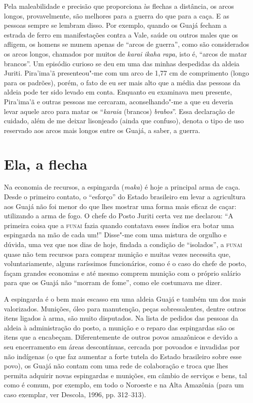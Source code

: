 Pela maleabilidade e precisão que proporciona às flechas a distância, os
arcos longos, provavelmente, são melhores para a guerra do que para a
caça. E as pessoas sempre se lembram disso. Por exemplo, quando os Guajá
fecham a estrada de ferro em manifestações contra a Vale, saúde ou
outros males que os afligem, os homens se munem apenas de ``arcos de
guerra'', como são considerados os arcos longos, chamados por muitos de
\emph{karai ikaha rapa}, isto é, ``arcos de matar brancos''. Um episódio
curioso se deu em uma das minhas despedidas da aldeia Juriti. Pira'ima'ã
presenteou"-me com um arco de 1,77 cm de comprimento (longo para os
padrões), porém, o fato de eu ser mais alto que a média das pessoas da
aldeia pode ter sido levado em conta. Enquanto eu examinava meu
presente, Pira'ima'ã e outras pessoas me cercaram, aconselhando"-me a que
eu deveria levar aquele arco para matar os ``\emph{karaia} (brancos)
\emph{brabos}''. Essa declaração de cuidado, além de me deixar lisonjeado
(ainda que confuso), denota o tipo de uso reservado aos arcos mais
longos entre os Guajá, a saber, a guerra.

\section{Ela, a flecha}

Na economia de recursos, a espingarda (\emph{maka}) é hoje a principal
arma de caça. Desde o primeiro contato, o ``esforço'' do Estado brasileiro
em levar a agricultura aos Guajá não foi menor do que lhes mostrar uma
forma mais eficaz de caçar: utilizando a arma de fogo. O chefe do Posto
Juriti certa vez me declarou: ``A primeira coisa que a \textsc{funai} fazia quando
contatava esses índios era botar uma espingarda na mão de cada um!''
Disse"-me com uma mistura de orgulho e dúvida, uma vez que nos dias de
hoje, findada a condição de ``isolados'', a \textsc{funai} quase não tem recursos
para comprar munição e muitas vezes necessita que, voluntariamente,
alguns raríssimos funcionários, como é o caso do chefe de posto, façam
grandes economias e até mesmo comprem munição com o próprio salário para
que os Guajá não ``morram de fome'', como ele costumava me dizer.

A espingarda é o bem mais escasso em uma aldeia Guajá e também um dos
mais valorizados. Munições, óleo para manutenção, peças sobressalentes,
dentre outros itens ligados à arma, são muito disputados. Na lista de
pedidos das pessoas da aldeia à administração do posto, a munição e o
reparo das espingardas são os itens que a encabeçam. Diferentemente de
outros povos amazônicos e devido a seu encerramento em áreas
descontínuas, cercada por povoados e invadidas por não indígenas (o que
faz aumentar a forte tutela do Estado brasileiro sobre esse povo), os
Guajá não contam com uma rede de colaboração e troca que lhes permita
adquirir novas espingardas e munições, em câmbio de serviços e bens, tal
como é comum, por exemplo, em todo o Noroeste e na Alta Amazônia (para
um caso exemplar, ver Descola, 1996, pp. 312--313).


